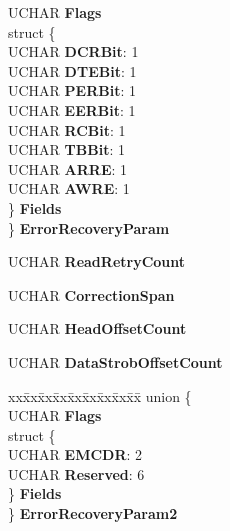 \begin{DoxyCompactItemize}
\begin{tabbing}
\>UCHAR {\bfseries Flags}\\
\>struct \{\\
\>\>UCHAR {\bfseries DCRBit}: 1\\
\>\>UCHAR {\bfseries DTEBit}: 1\\
\>\>UCHAR {\bfseries PERBit}: 1\\
\>\>UCHAR {\bfseries EERBit}: 1\\
\>\>UCHAR {\bfseries RCBit}: 1\\
\>\>UCHAR {\bfseries TBBit}: 1\\
\>\>UCHAR {\bfseries ARRE}: 1\\
\>\>UCHAR {\bfseries AWRE}: 1\\
\>\} {\bfseries Fields}\\
\} {\bfseries ErrorRecoveryParam}\\

\end{tabbing}\item 
\mbox{\label{struct___m_o_d_e___r_e_a_d___w_r_i_t_e___r_e_c_o_v_e_r_y___p_a_g_e_a7dd416172d870d98801d5a5274a1195a}} 
U\+C\+H\+AR {\bfseries Read\+Retry\+Count}
\item 
\mbox{\label{struct___m_o_d_e___r_e_a_d___w_r_i_t_e___r_e_c_o_v_e_r_y___p_a_g_e_a544938c942eacf4b89500aacdd9f1378}} 
U\+C\+H\+AR {\bfseries Correction\+Span}
\item 
\mbox{\label{struct___m_o_d_e___r_e_a_d___w_r_i_t_e___r_e_c_o_v_e_r_y___p_a_g_e_a76d47dd46cd4c458e791d833fc0f893e}} 
U\+C\+H\+AR {\bfseries Head\+Offset\+Count}
\item 
\mbox{\label{struct___m_o_d_e___r_e_a_d___w_r_i_t_e___r_e_c_o_v_e_r_y___p_a_g_e_a67aa289a2d051edfcaf8b05458801a32}} 
U\+C\+H\+AR {\bfseries Data\+Strob\+Offset\+Count}
\item 
\mbox{\label{struct___m_o_d_e___r_e_a_d___w_r_i_t_e___r_e_c_o_v_e_r_y___p_a_g_e_aec8882b4a980664d050c51f3623d0576}} 
\begin{tabbing}
xx\=xx\=xx\=xx\=xx\=xx\=xx\=xx\=xx\=\kill
union \{\\
\>UCHAR {\bfseries Flags}\\
\>struct \{\\
\>\>UCHAR {\bfseries EMCDR}: 2\\
\>\>UCHAR {\bfseries Reserved}: 6\\
\>\} {\bfseries Fields}\\
\} {\bfseries ErrorRecoveryParam2}\\


\end{tabbing}
\end{DoxyCompactItemize}
